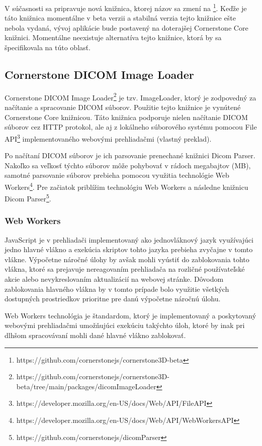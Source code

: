 V súčasnosti sa pripravuje nová  knižnica, ktorej názov sa zmení na \footnote{https://github.com/cornerstonejs/cornerstone3D-beta}. Keďže je táto knižnica momentálne v beta verzii a stabilná verzia tejto knižnice ešte nebola vydaná, vývoj aplikácie bude postavený na doterajšej Cornerstone Core knižnici.
Momentálne neexistuje alternatíva tejto knižnice, ktorá by sa špecifikovala na túto oblasť.

\subsection {Cornerstone DICOM Image Loader}
Cornerstone DICOM Image Loader\footnote{https://github.com/cornerstonejs/cornerstone3D-beta/tree/main/packages/dicomImageLoader} je tzv. ImageLoader, ktorý je zodpovedný za načítanie a spracovanie DICOM súborov. Použitie tejto knižnice je vynútené Cornerstone Core knižnicou. Táto knižnica podporuje nielen načítanie DICOM súborov cez HTTP protokol, ale aj z lokálneho súborového systému pomocou File API\footnote{https://developer.mozilla.org/en-US/docs/Web/API/File\textunderscore API} implementovaného webovými prehliadačmi \cite{about_cornerstone_dicom_image_loader} (vlastný preklad).

Po načítaní DICOM súborov je ich parsovanie prenechané knižnici Dicom Parser. Nakoľko sa veľkosť týchto súborov môže pohybovať v rádoch megabajtov (MB), samotné parsovanie súborov prebieha pomocou využitia technológie Web Workers\footnote{https://developer.mozilla.org/en-US/docs/Web/API/Web\textunderscore Workers\textunderscore API}. Pre začiatok priblížim technológiu Web Workers a následne knižnicu Dicom Parser\footnote{https://github.com/cornerstonejs/dicomParser}.

\subsubsection {Web Workers}
JavaScript je v prehliadači implementovaný ako jednovláknový jazyk využívajúci jedno hlavné vlákno a exekúcia skriptov tohto jazyka prebieha zvyčajne v tomto vlákne. Výpočetne náročné úlohy by avšak mohli vyústiť do zablokovania tohto vlákna, ktoré sa prejavuje nereagovaním prehliadača na rozličné používateľské akcie alebo nevykreslovaním aktualizácií na webovej stránke. Dôvodom zablokovania hlavného vlákna by v tomto prípade bolo využitie všetkých dostupných prostriedkov prioritne pre danú výpočetne náročnú úlohu.

Web Workers technológia je štandardom, ktorý je implementovaný a poskytovaný webovými prehliadačmi umožňujúci exekúciu takýchto úloh, ktoré by inak pri dlhšom spracovávaní mohli dané hlavné vlákno zablokovať.

